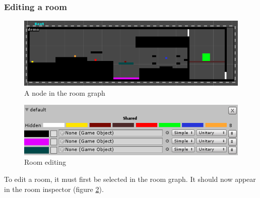 \documentclass[a4paper]{article}
\begin{document}
	
	\subsubsection{Editing a room}
	\begin{figure}[h]
		\includegraphics[width=\linewidth]{img/Node_Room.PNG}
		\caption{A node in the room graph}
		\label{fig:node_room}
	\end{figure}
	
	\begin{figure}[h]
		\includegraphics[width=\linewidth]{img/Menu_EditRoom.PNG}
		\caption{Room editing}
		\label{fig:edit_room}
	\end{figure}
	
	To edit a room, it must first be selected in the room graph. It should now appear in the room inspector (figure \ref{fig:edit_room}). 
\end{document}
